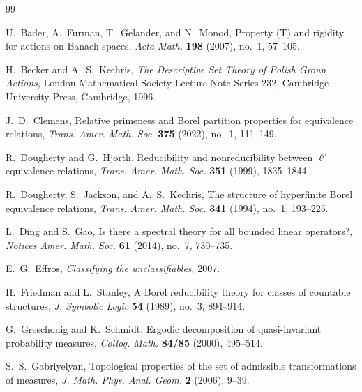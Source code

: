 \documentclass[11pt]{article}
\numberwithin{equation}{section}
\theoremstyle{definition}
\begin{document}
\begingroup
\raggedright
\begin{thebibliography}{99}

U.~Bader, A.~Furman, T.~Gelander, and N.~Monod,
Property (T) and rigidity for actions on Banach spaces,
\emph{Acta Math.} \textbf{198} (2007), no.~1, 57--105.

H.~Becker and A.~S.~Kechris,
\emph{The Descriptive Set Theory of Polish Group Actions},
London Mathematical Society Lecture Note Series 232,
Cambridge University Press, Cambridge, 1996.

J.~D.~Clemens,
Relative primeness and Borel partition properties for equivalence relations,
\emph{Trans. Amer. Math. Soc.} \textbf{375} (2022), no.~1, 111--149.

R.~Dougherty and G.~Hjorth,
Reducibility and nonreducibility between $\ell^p$ equivalence relations,
\emph{Trans. Amer. Math. Soc.} \textbf{351} (1999), 1835--1844.

R.~Dougherty, S.~Jackson, and A.~S.~Kechris,
The structure of hyperfinite Borel equivalence relations,
\emph{Trans. Amer. Math. Soc.} \textbf{341} (1994), no.~1, 193--225.

L.~Ding and S.~Gao,
Is there a spectral theory for all bounded linear operators?,
\emph{Notices Amer. Math. Soc.} \textbf{61} (2014), no.~7, 730--735.

E.~G.~Effros, \emph{Classifying the unclassifiables}, 2007.

H.~Friedman and L.~Stanley,
A Borel reducibility theory for classes of countable structures,
\emph{J. Symbolic Logic} \textbf{54} (1989), no.~3, 894--914.

G.~Greschonig and K.~Schmidt,
Ergodic decomposition of quasi-invariant probability measures,
\emph{Colloq. Math.} \textbf{84/85} (2000), 495--514.

S.~S.~Gabriyelyan,
Topological properties of the set of admissible transformations of measures,
\emph{J. Math. Phys. Anal. Geom.} \textbf{2} (2006), 9--39.


\end{thebibliography}
\end{document}
